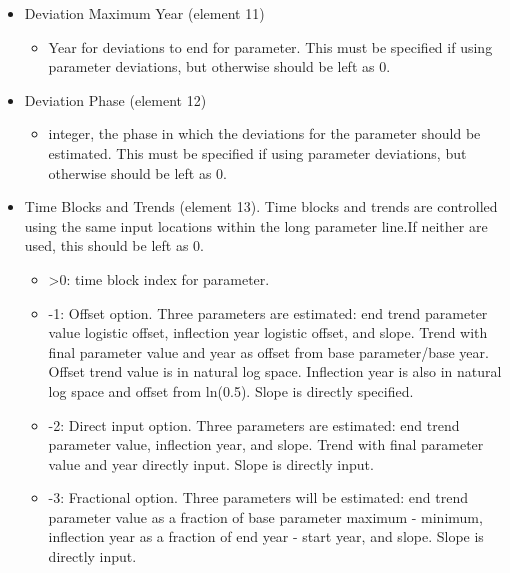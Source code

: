 \begin{itemize}
\item Deviation  Maximum Year (element 11)
	\begin{itemize}
		\item Year for deviations to end for parameter. This must be specified if using parameter deviations, but otherwise should be left as 0.
	\end{itemize}
	
\item Deviation Phase (element 12)
	\begin{itemize}
		\item integer, the phase in which the deviations for the parameter should be estimated. This must be specified if using parameter deviations, but otherwise should be left as 0.
	\end{itemize}
	
\item Time Blocks and Trends (element 13). Time blocks and trends are controlled using the same input locations within the long parameter line.If neither are used, this should be left as 0.
	\begin{itemize}
		\item >0: time block index for parameter.
		\item -1: Offset option. Three parameters are estimated: end trend parameter value logistic offset, inflection year logistic offset, and slope. Trend with final parameter value and year as offset from base parameter/base year. Offset trend value is in natural log space. Inflection year is also in natural log space and offset from ln(0.5). Slope is directly specified.
		\item -2: Direct input option. Three parameters are estimated: end trend parameter value, inflection year, and slope. Trend with final parameter value and year directly input. Slope is directly input.
		\item -3: Fractional option. Three parameters will be estimated: end trend parameter value as a fraction of base parameter maximum - minimum, inflection year as a fraction of end year - start year, and slope. Slope is directly input.
	\end{itemize}
	

\end{itemize}
